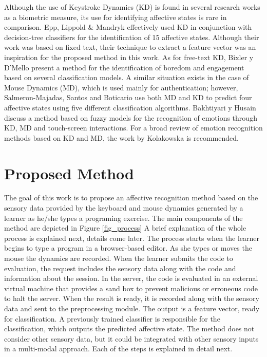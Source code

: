 \documentclass[a4paper]{llncs}
\begin{document}
Although the use of Keystroke Dynamics (KD) is found in several research works
as a biometric measure, its use for identifying affective states is rare in
comparison. Epp, Lippold \& Mandryk \cite{epp2011identifying} effectively used KD in conjunction
with decision-tree classifiers for the identification of 15 affective states.
Although their work was based on fixed text, their technique to extract a feature
vector was an inspiration for the proposed method in this work. As for free-text
KD, Bixler y D'Mello \cite{bixler2013detecting} present a method for the identification of boredom
and engagement based on several classification models. A similar situation exists in the case of Mouse Dynamics (MD), which is used mainly for authentication; however, Salmeron-Majadas, Santos
and Boticario \cite{salmeron2014exploring} use both MD and KD to predict four affective states using
five different classification algorithms. Bakhtiyari y Husain \cite{bakhtiyari2014fuzzy} discuss a
method based on fuzzy models for the recognition of emotions through KD, MD and
touch-screen interactions. For a broad review of emotion recognition methods
based on KD and MD, the work by Kolakowska \cite{kolakowska2013review} is recommended.

\section{Proposed Method}
\label{sec:method}

The goal of this work is to propose an affective
recognition method based on the sensory data provided by the keyboard and mouse
dynamics generated by a learner as he/she types a programing exercise. The main
components of the method are depicted in Figure \ref{fig_process} A brief explanation of the
whole process is explained next, details come later. The process starts when the
learner begins to type a program in a browser-based editor. As she types or
moves the mouse the dynamics are recorded. When the learner submits the code to
evaluation, the request includes the sensory data along with the code and
information about the session. In the server, the code is evaluated in an
external virtual machine that provides a sand box to prevent malicious or
erroneous code to halt the server. When the result is ready, it is recorded
along with the sensory data and sent to the preprocessing module. The output is
a feature vector, ready for classification. A previously trained classifier is
responsible for the classification, which outputs the predicted affective state.
The method does not consider other sensory data, but it could be integrated with
other sensory inputs in a multi-modal approach.  Each of the steps is explained
in detail next.
\end{document}
